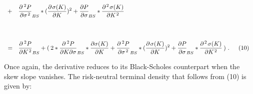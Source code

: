 \documentclass[12pt]{article}
\begin{document}
{\begin{align*}
\\[12pt]
&+ \hspace{8pt}   \frac{\partial^{\hspace{2pt} 2} P}{\partial \sigma^{\hspace{1pt} 2}}_{BS} * (\frac{\partial \hspace{1pt} \sigma(K)}{\partial K})^{2} + \frac{\partial P}{\partial \sigma}_{\hspace{-1pt} BS} * \frac{\partial^{\hspace{1pt} 2} \hspace{1pt} \sigma(K)}{\partial K^{\hspace{1pt} 2}}
\\[35pt]
\hspace{3pt} &= \hspace{7pt}   \frac{\partial^{\hspace{2pt} 2} P}{\partial K^{\hspace{1pt} 2}}_{BS} + (\hspace{2pt} 2*\frac{\partial^{\hspace{2pt} 2} P}{\partial K \partial \sigma}_{BS} * \frac{\partial \sigma(K)}{\partial K} + \frac{\partial^{\hspace{2pt} 2} P}{\partial \sigma^{\hspace{1pt} 2}}_{BS} * (\frac{\partial \hspace{1pt} \sigma(K)}{\partial K})^{2} + \frac{\partial P}{\partial \sigma}_{\hspace{-1pt} BS} * \frac{\partial^{\hspace{1pt} 2} \hspace{1pt} \sigma(K)}{\partial K^{\hspace{1pt} 2}} \hspace{2pt}) \hspace{3pt}. \hspace{15pt} (10)
\end{align*}
}

\begin{paragraph}
\indent Once again, the derivative reduces to its Black-Scholes counterpart when the skew slope vanishes. The risk-neutral terminal density that follows from (10) is given by:  
\end{paragraph}
\end{document}
